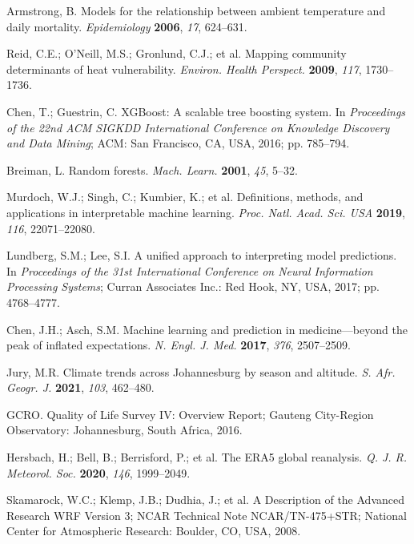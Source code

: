 \documentclass[journal,article,submit,pdftex,moreauthors]{Definitions/mdpi}
\begin{document}
\begin{thebibliography}{999}
Armstrong, B. Models for the relationship between ambient temperature and daily mortality. \emph{Epidemiology} \textbf{2006}, \emph{17}, 624--631.

Reid, C.E.; O'Neill, M.S.; Gronlund, C.J.; et al. Mapping community determinants of heat vulnerability. \emph{Environ. Health Perspect.} \textbf{2009}, \emph{117}, 1730--1736.

Chen, T.; Guestrin, C. XGBoost: A scalable tree boosting system. In \emph{Proceedings of the 22nd ACM SIGKDD International Conference on Knowledge Discovery and Data Mining}; ACM: San Francisco, CA, USA, 2016; pp. 785--794.

Breiman, L. Random forests. \emph{Mach. Learn.} \textbf{2001}, \emph{45}, 5--32.

Murdoch, W.J.; Singh, C.; Kumbier, K.; et al. Definitions, methods, and applications in interpretable machine learning. \emph{Proc. Natl. Acad. Sci. USA} \textbf{2019}, \emph{116}, 22071--22080.

Lundberg, S.M.; Lee, S.I. A unified approach to interpreting model predictions. In \emph{Proceedings of the 31st International Conference on Neural Information Processing Systems}; Curran Associates Inc.: Red Hook, NY, USA, 2017; pp. 4768--4777.

Chen, J.H.; Asch, S.M. Machine learning and prediction in medicine—beyond the peak of inflated expectations. \emph{N. Engl. J. Med.} \textbf{2017}, \emph{376}, 2507--2509.

Jury, M.R. Climate trends across Johannesburg by season and altitude. \emph{S. Afr. Geogr. J.} \textbf{2021}, \emph{103}, 462--480.

GCRO. Quality of Life Survey IV: Overview Report; Gauteng City-Region Observatory: Johannesburg, South Africa, 2016.

Hersbach, H.; Bell, B.; Berrisford, P.; et al. The ERA5 global reanalysis. \emph{Q. J. R. Meteorol. Soc.} \textbf{2020}, \emph{146}, 1999--2049.

Skamarock, W.C.; Klemp, J.B.; Dudhia, J.; et al. A Description of the Advanced Research WRF Version 3; NCAR Technical Note NCAR/TN-475+STR; National Center for Atmospheric Research: Boulder, CO, USA, 2008.


\end{thebibliography}
\end{document}
